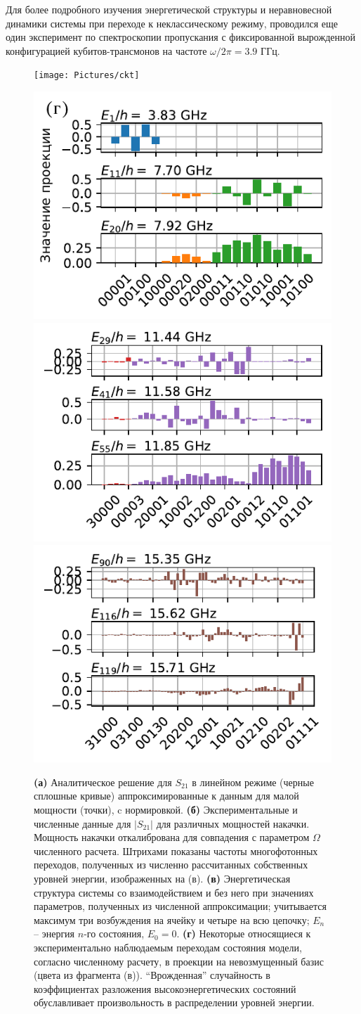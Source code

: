 \documentclass[14pt, a4paper]{extarticle}
\begin{document}
Для более подробного изучения энергетической структуры и неравновесной динамики системы при переходе к неклассическому режиму, проводился еще один эксперимент по спектроскопии пропускания с фиксированной вырожденной конфигурацией кубитов\hyp трансмонов на частоте $\omega/2\pi = 3.9$ ГГц.
\begin{figure}[h!]
	\texttt{[image: Pictures/ckt]}
	
	\includegraphics[width=.328\linewidth]{Pictures/eigenstates1}
	\includegraphics[width=.328\linewidth]{Pictures/eigenstates2}
	\includegraphics[width=.328\linewidth]{Pictures/eigenstates3}
	\caption{\textbf{(а)} Аналитическое решение для $S_{21}$ в линейном режиме (черные сплошные кривые) аппроксимированные к данным для малой мощности (точки), c нормировкой. \textbf{(б)} Экспериментальные и численные данные для $|S_{21}|$ для различных мощностей накачки. Мощность накачки откалибрована для совпадения с параметром $\Omega$ численного расчета. Штрихами показаны частоты многофотонных переходов, полученных из численно рассчитанных собственных уровней энергии, изображенных на (в). \textbf{(в)} Энергетическая структура системы со взаимодействием и без него при значениях параметров, полученных из численной аппроксимации; учитывается максимум три возбуждения на ячейку и четыре на всю цепочку; $E_n$ -- энергия $n$-го состояния, $E_0 =0$. \textbf{(г)} Некоторые относящиеся к экспериментально наблюдаемым переходам состояния модели, согласно численному расчету, в проекции на невозмущенный базис (цвета из фрагмента (в)). ``Врожденная'' случайность в коэффициентах разложения высокоэнергетических состояний обуславливает произвольность в распределении уровней энергии.}
	\label{fig:ckt}
\end{figure}
\end{document}

